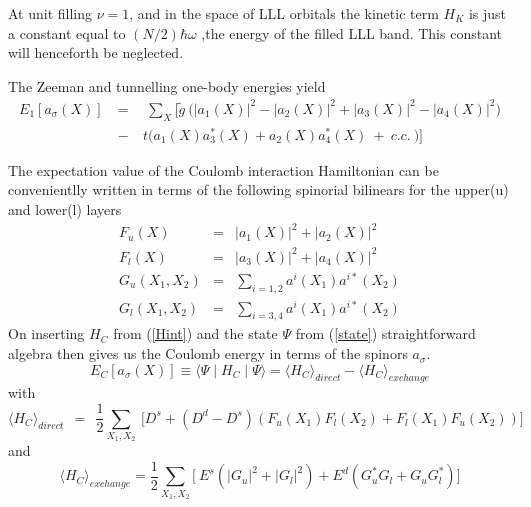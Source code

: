 At unit filling $\nu=1$, and in the space of LLL orbitals
the kinetic term $H_K$ is just a constant equal to
$(N/2) \hbar \omega $ ,the energy of the filled
LLL band. This constant will henceforth be neglected.

The Zeeman and tunnelling one-body energies yield
\begin{eqnarray} E_{1} [ a_{\sigma}(X) ] \ &=& \  \ \sum_{X} \bigg[ \tilde{g} \ 
\bigg(|a_{1}(X)|^{2} - |a_{2}(X)|^{2} + 
|a_{3}(X)|^{2} - |a_{4}(X)|^{2} \bigg) \nonumber \\ 
&-& \ t \bigg(a_{1}(X)a_{3}^{*}(X) + 
a_{2}(X)a_{4}^{*}(X) \ + \ c.c. \ \bigg) \bigg] \label{1body} \end{eqnarray}

The expectation value of the Coulomb interaction Hamiltonian can be
convenientlly written in terms of the following
spinorial bilinears for the upper(u) and lower(l) layers
\begin{eqnarray} F_{u}(X) & = & |a_{1}(X)|^{2} + |a_{2}(X)|^{2} \label{F1} \\ 
F_{l}(X) & = & |a_{3}(X)|^{2} + |a_{4}(X)|^{2} \label{F2} \\ 
G_{u}(X_{1},X_{2}) & = & \sum_{i=1,2} a^{i}(X_{1})a^{i \ast}(X_{2})
\label{G1} \\ 
G_{l}(X_{1},X_{2}) & = & \sum_{i=3,4} a^{i}(X_{1})a^{i \ast}(X_{2}) 
\label{G2} \end{eqnarray}
On inserting $H_C$ from (\ref{Hint}) and the state 
$\Psi$ from (\ref{state}) straightforward algebra then gives
us the Coulomb 
energy in terms of the spinors $a_{\sigma}$. 
\begin{equation} E_{C} [ a_{\sigma}(X) ] \equiv 
\langle \Psi \mid H_{C} \mid \Psi \rangle
= \langle H_{C} \rangle_{direct} - \langle H_{C} \rangle_{exchange}
\label{energy} \end{equation}
with
\begin{equation} \langle H_{C} \rangle_{direct} \ \  
= \ \  \frac{1}{2} \sum_{X_{1},X_{2}} \ \bigg[
D^{s} 
+ (D^{d} - D^{s} )
( F_{u}(X_{1})F_{l}(X_{2}) + F_{l}(X_{1})F_{u}(X_{2}) )
\bigg] \label{dir} \end{equation}
and
\begin{equation} \langle H_{C} \rangle_{exchange} =
\frac{1}{2} \sum_{X_{1},X_{2}} \bigg[ \ E^{s}(|G_{u}|^{2} +
|G_{l}|^{2}) + E^{d}(G_{u}^{\ast}G_{l} + G_{u} G_{l}^{\ast} )
\bigg] \label{ex} \end{equation}


